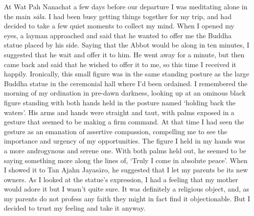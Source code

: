 At Wat Pah Nanachat a few days before our departure I was meditating
alone in the main \emph{sāla}. I had been busy getting things together
for my trip, and had decided to take a few quiet moments to collect my
mind. When I opened my eyes, a layman approached and said that he wanted
to offer me the Buddha statue placed by his side. Saying that the Abbot
would be along in ten minutes, I suggested that he wait and offer it to
him. He went away for a minute, but then came back and said that he
wished to offer it to me, so this time I received it happily. 
Ironically, this small figure was in the same standing posture as the
large Buddha statue in the ceremonial hall where I'd been ordained. I
remembered the morning of my ordination in pre-dawn darkness, looking up
at an ominous black figure standing with both hands held in the posture
named `holding back the waters'. His arms and hands were straight and
taut, with palms exposed in a gesture that seemed to be making a firm
command. At that time I had seen the gesture as an emanation of
assertive compassion, compelling me to see the importance and urgency of
my opportunities. The figure I held in my hands was a more androgynous
and serene one. With both palms held out, he seemed to be saying
something more along the lines of, `Truly I come in absolute peace'. 
When I showed it to Tan Ajahn Jayasāro, he suggested that I let my
parents be its new owners. As I looked at the statue's expression, I had
a feeling that my mother would adore it but I wasn't quite sure. It was
definitely a religious object, and, as my parents do not profess any
faith they might in fact find it objectionable. But I decided to trust
my feeling and take it anyway. 

